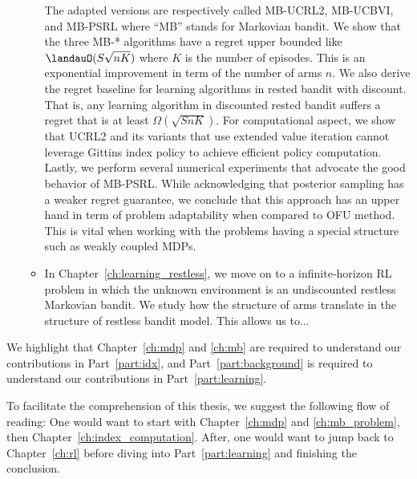 \begin{itemize}
\begin{itemize}
                The adapted versions are respectively called MB-UCRL2, MB-UCBVI, and MB-PSRL where ``MB'' stands for Markovian bandit.
                We show that the three MB-* algorithms have a regret upper bounded like $\landauO(S\sqrt{nK})$ where $K$ is the number of episodes.
                This is an exponential improvement in term of the number of arms $n$.
                We also derive the regret baseline for learning algorithms in rested bandit with discount.
                That is, any learning algorithm in discounted rested bandit suffers a regret that is at least $\Omega(\sqrt{SnK})$.
                For computational aspect, we show that UCRL2 and its variants that use extended value iteration \cite{jaksch2010near} cannot leverage Gittins index policy to achieve efficient policy computation.
                Lastly, we perform several numerical experiments that advocate the good behavior of MB-PSRL.
                While acknowledging that posterior sampling has a weaker regret guarantee, we conclude that this approach has an upper hand in term of problem adaptability when compared to OFU method.
                This is vital when working with the problems having a special structure such as weakly coupled MDPs.
            \item In Chapter~\ref{ch:learning_restless}, we move on to a infinite-horizon RL problem in which the unknown environment is an undiscounted restless Markovian bandit.
                We study how the structure of arms translate in the structure of restless bandit model.
                This allows us to...
        \end{itemize}
\end{itemize}

We highlight that Chapter~\ref{ch:mdp} and \ref{ch:mb} are required to understand our contributions in Part~\ref{part:idx}, and
Part~\ref{part:background} is required to understand our contributions in Part~\ref{part:learning}.

To facilitate the comprehension of this thesis, we suggest the following flow of reading: One would want to start with Chapter~\ref{ch:mdp} and \ref{ch:mb_problem}, then Chapter~\ref{ch:index_computation}. After, one would want to jump back to Chapter~\ref{ch:rl} before diving into Part~\ref{part:learning} and finishing the conclusion.

%

\endgroup
